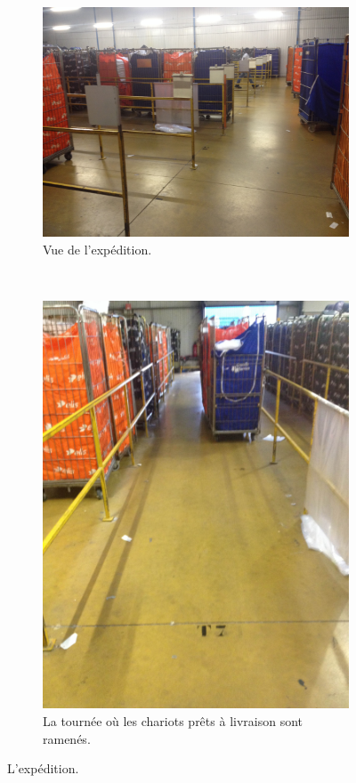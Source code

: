 \documentclass{article}
\newcommand{\rapportFigure}{0.075}
\begin{document}
%
\begin{figure}[h]
    \begin{subfigure}{0.53\textwidth}
        \centering
        \includegraphics[scale= 0.078]{images/expedition}
        \caption{Vue de l'expédition.}
        \label{fig:exp}
    \end{subfigure}
    ~
    \begin{subfigure}{0.44\textwidth}
        \centering
        \includegraphics[angle=-90,scale= \rapportFigure]{images/tournee}
        \caption{La tournée où les chariots prêts à livraison sont ramenés.}
        \label{fig:tournee}
    \end{subfigure}
    
    \caption{L'expédition.}
\end{figure}
%
\end{document}
